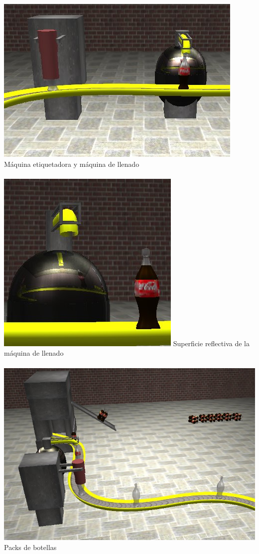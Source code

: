 \documentclass[11pt]{article}
\begin{document}
 \includegraphics[scale=0.5]{maquinas} Máquina etiquetadora y máquina de llenado \\ \\
\includegraphics[scale=0.5]{reflejo} Superficie reflectiva de la máquina de llenado \\ \\
\includegraphics[scale=0.5]{pack1} Packs de botellas
\end{document}
